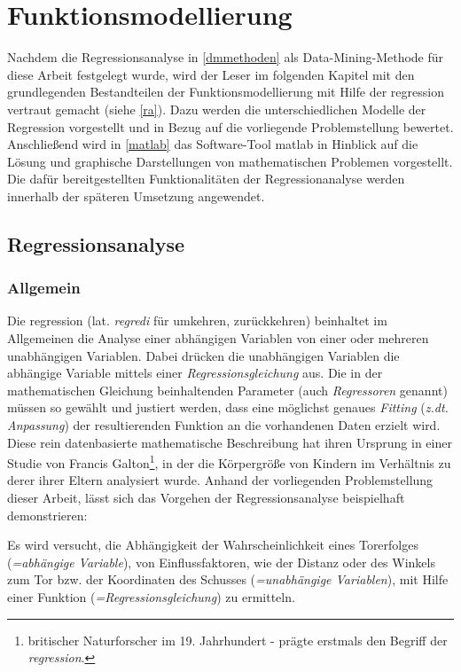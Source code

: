 \section{Funktionsmodellierung}
\label{fm}
Nachdem die Regressionsanalyse in \vref{dmmethoden} als Data-Mining-Methode für diese Arbeit festgelegt wurde, wird der Leser im folgenden Kapitel mit den grundlegenden Bestandteilen der Funktionsmodellierung mit Hilfe der \gls{regression} vertraut gemacht (siehe \vref{ra}). Dazu werden die unterschiedlichen Modelle der Regression vorgestellt und in Bezug auf die vorliegende Problemstellung bewertet. Anschließend wird in \vref{matlab} das Software-Tool \gls{matlab} in Hinblick auf die Lösung und graphische Darstellungen von mathematischen Problemen vorgestellt. Die dafür bereitgestellten Funktionalitäten der Regressionanalyse werden innerhalb der späteren Umsetzung angewendet.


\subsection{Regressionsanalyse}
\label{ra}
\subsubsection{Allgemein}
Die \gls{regression} (lat. \textit{regredi} für umkehren, zurückkehren) beinhaltet im Allgemeinen die Analyse einer abhängigen Variablen von einer oder mehreren unabhängigen Variablen. Dabei drücken die unabhängigen Variablen die abhängige Variable mittels einer \textit{Regressionsgleichung} aus. Die in der mathematischen Gleichung beinhaltenden Parameter (auch \textit{Regressoren} genannt) müssen so gewählt und justiert werden, dass eine möglichst genaues \textit{Fitting} (\textit{z.dt. Anpassung}) der resultierenden Funktion an die vorhandenen Daten erzielt wird. Diese rein datenbasierte mathematische Beschreibung hat ihren Ursprung in einer Studie von Francis Galton\footnote{britischer Naturforscher im 19. Jahrhundert - prägte erstmals den Begriff der \textit{\gls{regression}}.}, in der die Körpergröße von Kindern im Verhältnis zu derer ihrer Eltern analysiert wurde. Anhand der vorliegenden Problemstellung dieser Arbeit, lässt sich das Vorgehen der Regressionsanalyse beispielhaft demonstrieren:

Es wird versucht, die Abhängigkeit der Wahrscheinlichkeit eines Torerfolges (\textit{=abhängige Variable}), von Einflussfaktoren, wie der Distanz oder des Winkels zum Tor bzw. der Koordinaten des Schusses (\textit{=unabhängige Variablen}), mit Hilfe einer Funktion (\textit{=Regressionsgleichung}) zu ermitteln. 

